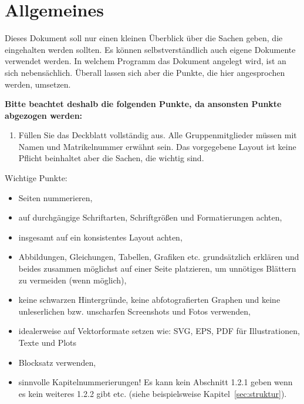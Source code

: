\documentclass[a4paper, 12pt]{article}
\begin{document}
\newcommand\labgroup{A1}
\newcommand\firstauthorname{Vorname1 Nachname1}
\newcommand\firstauthormatnr{000000}
\newcommand\secondauthorname{Vorname2 Nachname2}
\newcommand\secondauthormatnr{000001}
\newcommand\thirdauthorname{Vorname3 Nachname3}
\newcommand\thirdauthormatnr{000002}


\newpage

\tableofcontents
\newpage

\section{Allgemeines}
Dieses Dokument soll nur einen kleinen Überblick über die Sachen geben, die eingehalten werden sollten. Es können selbstverständlich auch eigene Dokumente verwendet werden. In welchem Programm das Dokument angelegt wird, ist an sich nebensächlich. Überall lassen sich aber die Punkte, die hier angesprochen werden, umsetzen.

\textbf{Bitte beachtet deshalb die folgenden Punkte, da ansonsten Punkte abgezogen werden:}
\begin{enumerate}
    \item Füllen Sie das Deckblatt vollständig aus. Alle Gruppenmitglieder müssen mit Namen und Matrikelnummer erwähnt sein. Das vorgegebene Layout ist keine Pflicht beinhaltet aber die Sachen, die wichtig sind.
\end{enumerate}

Wichtige Punkte:
\begin{itemize}
    \item Seiten nummerieren,
    \item auf durchgängige Schriftarten, Schriftgrößen und Formatierungen achten,
    \item insgesamt auf ein konsistentes Layout achten,
    \item Abbildungen, Gleichungen, Tabellen, Grafiken etc. grundsätzlich erklären und beides zusammen möglichst auf einer Seite platzieren, um unnötiges Blättern zu vermeiden (wenn möglich),
    \item keine schwarzen Hintergründe, keine abfotografierten Graphen und keine unleserlichen bzw. unscharfen Screenshots und Fotos verwenden,
    \item idealerweise auf Vektorformate setzen wie: SVG, EPS, PDF für Illustrationen, Texte und Plots
    \item Blocksatz verwenden,
    \item sinnvolle Kapitelnummerierungen! Es kann kein Abschnitt 1.2.1 geben wenn es kein weiteres 1.2.2 gibt etc. (siehe beispielsweise Kapitel~\ref{sec:struktur}).
\end{itemize}
\end{document}
